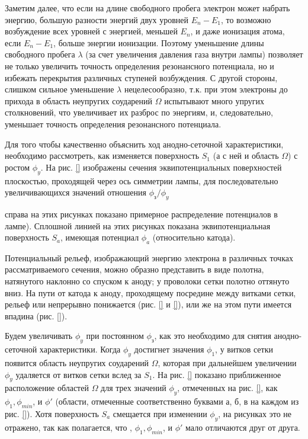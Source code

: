Заметим далее, что если на длине свободного пробега электрон может набрать энергию, большую разности энергий двух уровней $E_n-E_1$, то возможно возбуждение всех уровней с энергией, меньшей $E_n$, и даже ионизация атома, если $E_n-E_1$, больше энергии ионизации. Поэтому уменьшение длины свободного пробега $\lambda$ (за счет увеличения давления газа внутри лампы) позволяет не только увеличить точность определения резонансного потенциала, но и избежать перекрытия различных ступеней возбуждения. С другой стороны, слишком сильное уменьшение $\lambda$ нецелесообразно, т.к. при этом электроны до прихода в область неупругих соударений $\Omega$ испытывают много упругих столкновений, что увеличивает их разброс по энергиям, и, следовательно, уменьшает точность определения резонансного потенциала.

Для того чтобы качественно объяснить ход анодно-сеточной характеристики, необходимо рассмотреть, как изменяется поверхность $S_1$ (а с ней и область $\Omega$) с ростом $\phi_y$. На рис. \ref{} изображены сечения эквипотенциальных поверхностей плоскостью, проходящей через ось симметрии лампы, для последовательно увеличивающихся значений отношения $\displaystyle\phi_\text{з}/\phi_y$ {справа на этих рисунках показано примерное распределение потенциалов в лампе). Сплошной линией на этих рисунках показана эквипотенциальная поверхность $S_a$, имеющая потенциал $\phi_a$ (относительно катода).

Потенциальный рельеф, изображающий энергию электрона в различных точках рассматриваемого сечения, можно образно представить в виде полотна, натянутого наклонно со спуском к аноду; у проволоки сетки полотно оттянуто вниз. На пути от катода к аноду, проходящему посредине между витками сетки, рельеф или непрерывно понижается (рис. \ref{} и \ref{}), или же на этом пути имеется впадина (рис. \ref{}).

Будем увеличивать $\phi_y$ при постоянном $\phi_\text{з}$, как это необходимо для снятия анодно-сеточной характеристики. Когда $\phi_y$ достигнет значения $\phi_1$, у витков сетки появится область неупругих соударений $\Omega$, которая при дальнейшем увеличении $\phi_y$ удаляется от витков сетки вслед за $S_1$. На рис. \ref{} показано приближенное расположение областей $\Omega$ для трех значений $\phi_y$, отмеченных на рис. \ref{}, как $\phi_1, \phi_{min}$, и $\phi'$ (области, отмеченные соответственно буквами а, б, в на каждом из рис. \ref{}). Хотя поверхность $S_a$ смещается при изменении $\phi_y$, на рисунках это не отражено, так как полагается, что , $\phi_1, \phi_{min}$, и $\phi'$ мало отличаются друг от друга.

}
